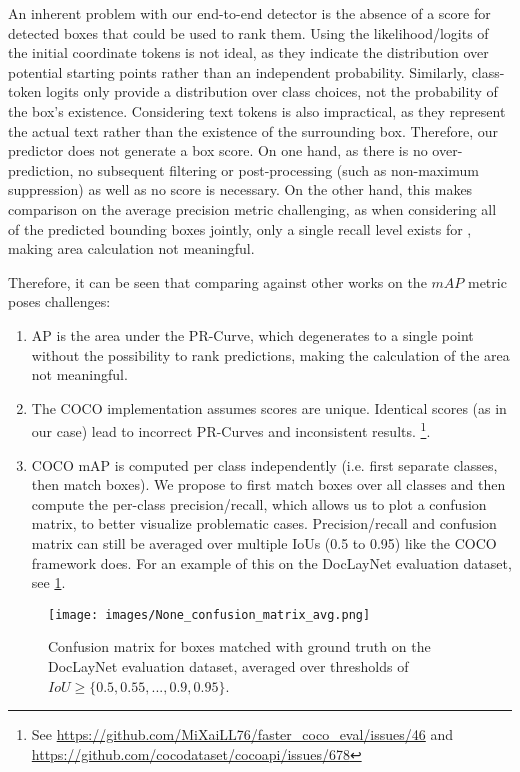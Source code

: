 An inherent problem with our end-to-end detector is the absence of a score for detected boxes that could be used to rank them. Using the likelihood/logits of the initial coordinate tokens is not ideal, as they indicate the distribution over potential starting points rather than an independent probability. Similarly, class-token logits only provide a distribution over class choices, not the probability of the box's existence. Considering text tokens is also impractical, as they represent the actual text rather than the existence of the surrounding box. Therefore, our predictor does not generate a box score. On one hand, as there is no over-prediction, no subsequent filtering or post-processing (such as non-maximum suppression) as well as no score is necessary. On the other hand, this makes comparison on the average precision metric challenging, as when considering all of the predicted bounding boxes jointly, only a single recall level exists for \eclair, making area calculation not meaningful. 

Therefore, it can be seen that comparing \eclair against other works on the $mAP$ metric poses challenges:

\begin{enumerate}
    \item AP is the area under the PR-Curve, which degenerates to a single point without the possibility to rank predictions, making the calculation of the area not meaningful.
    \item The COCO implementation assumes scores are unique. Identical scores (as in our case) lead to incorrect PR-Curves and inconsistent results. \footnote{See \url{https://github.com/MiXaiLL76/faster_coco_eval/issues/46} and \url{https://github.com/cocodataset/cocoapi/issues/678}}.
    \item COCO mAP is computed per class independently (i.e. first separate classes, then match boxes). We propose to first match boxes over all classes and then compute the per-class precision/recall, which allows us to plot a confusion matrix, to better visualize problematic cases. Precision/recall and confusion matrix can still be averaged over multiple IoUs (0.5 to 0.95) like the COCO framework does. For an example of this on the DocLayNet evaluation dataset, see \cref{fig:eclair_conf_mat}.
\end{enumerate}

\begin{figure}[h]
    \centering
    \texttt{[image: images/None\_confusion\_matrix\_avg.png]}
    \caption{Confusion matrix for \eclair boxes matched with ground truth on the DocLayNet evaluation dataset, averaged over thresholds of $IoU \geq \{0.5, 0.55, ..., 0.9, 0.95\}$.}
    \label{fig:eclair_conf_mat}
\end{figure}

